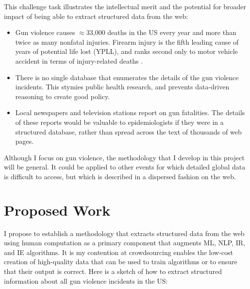 \documentclass[11pt]{article}
\begin{document}
This challenge task illustrates the intellectual merit and the potential for broader impact of being able to extract structured data from the web:
\begin{itemize}
\item Gun violence causes $\approx$33,000 deaths in the US every year and more than twice as many nonfatal injuries. Firearm injury is the fifth leading cause of years of potential life lost (YPLL), and ranks second only to motor vehicle accident in terms of injury-related deaths  \cite{ficapresourcebook}. 
\item There is no single database that enumerates the details of the gun violence incidents.  This stymies public health research, and prevents data-driven reasoning to create good policy. 
\item Local newspapers and television stations report on gun fatalities. The details of these reports would be valuable to epidemiologists if they were in a structured database, rather than spread across the text of thousands of web pages.
\end{itemize}
Although I focus on gun violence, the methodology that I develop in this project will be general.  It could be applied to other events for which detailed global data is difficult to access, but which is described in a dispersed fashion on the web.  



\section{Proposed Work}

I propose to establish a methodology that extracts structured data from the web using human computation as a primary component that augments ML, NLP, IR, and IE algorithms.  It is my contention at crowdsourcing enables the low-cost creation of high-quality data that can be used to train algorithms or to ensure that their output is correct.   Here is a sketch of how to extract structured information about all gun violence incidents in the US:
\end{document}
